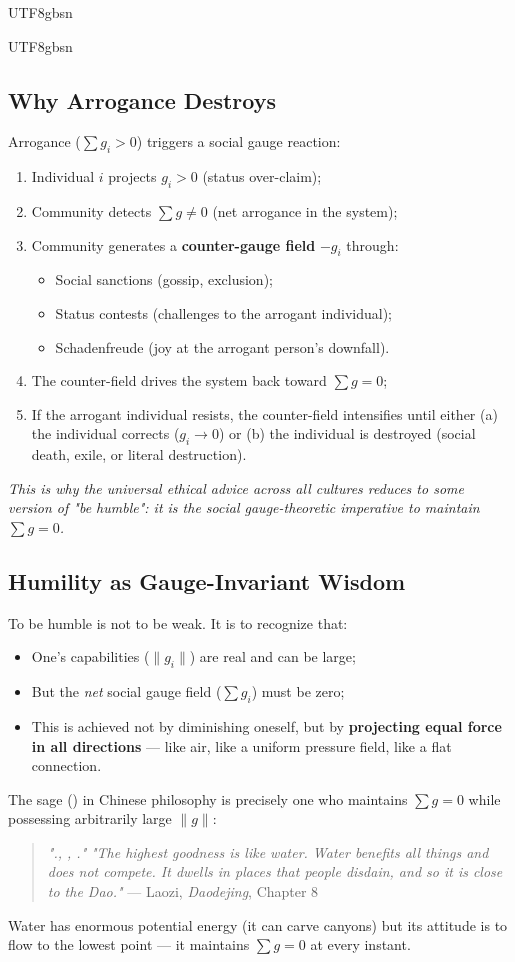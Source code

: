 \documentclass[11pt,a4paper]{article}
\begin{document}
\begin{CJK}{UTF8}{gbsn}
{\begin{CJK}{UTF8}{gbsn}
\subsection{Why Arrogance Destroys}
Arrogance ($\sum g_i > 0$) triggers a social gauge reaction:
\begin{enumerate}[label=(\roman*)]
    \item Individual $i$ projects $g_i > 0$ (status over-claim);
    \item Community detects $\sum g \neq 0$ (net arrogance in the system);
    \item Community generates a \textbf{counter-gauge field} $-g_i$ through:
          \begin{itemize}
              \item Social sanctions (gossip, exclusion);
              \item Status contests (challenges to the arrogant individual);
              \item Schadenfreude (joy at the arrogant person's downfall).
          \end{itemize}
    \item The counter-field drives the system back toward $\sum g = 0$;
    \item If the arrogant individual resists, the counter-field intensifies until
          either (a) the individual corrects ($g_i \to 0$) or (b) the individual
          is destroyed (social death, exile, or literal destruction).
\end{enumerate}
\textit{This is why the universal ethical advice across all cultures reduces to
some version of "be humble": it is the social gauge-theoretic imperative to
maintain $\sum g = 0$.}
\subsection{Humility as Gauge-Invariant Wisdom}
To be humble is not to be weak. It is to recognize that:
\begin{itemize}
    \item One's capabilities ($\|g_i\|$) are real and can be large;
    \item But the \textit{net} social gauge field ($\sum g_i$) must be zero;
    \item This is achieved not by diminishing oneself, but by \textbf{projecting
          equal force in all directions} --- like air, like a uniform pressure field,
          like a flat connection.
\end{itemize}
The sage () in Chinese philosophy is precisely one who maintains $\sum g = 0$
while possessing arbitrarily large $\|g\|$:
\begin{quote}
    \textit{"., , ."}
    \textit{"The highest goodness is like water. Water benefits all things
    and does not compete. It dwells in places that people disdain, and so
    it is close to the Dao."} --- Laozi, \textit{Daodejing}, Chapter 8
\end{quote}
Water has enormous potential energy (it can carve canyons) but its attitude is
to flow to the lowest point --- it maintains $\sum g = 0$ at every instant.

\end{CJK}}
\end{CJK}
\end{document}
